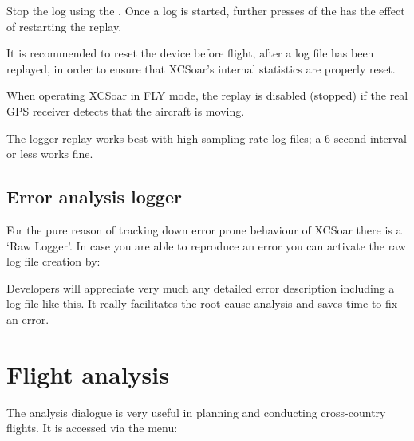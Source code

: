 Stop the log using the .
Once a log is started, further presses of the  has the
effect of restarting the replay.

\tip It is recommended to reset the device before flight, after a log
file has been replayed, in order to ensure that XCSoar's internal
statistics are properly reset.

When operating XCSoar in FLY mode, the replay is disabled (stopped) if
the real GPS receiver detects that the aircraft is moving.

The logger replay works best with high sampling rate log files;
a 6 second interval or less works fine.

\subsection*{Error analysis logger}\label{sec:raw-logger}
For the pure reason of tracking down error prone behaviour of XCSoar
there is a `Raw Logger'. In case you are able to reproduce an error you can
activate the raw log file creation by:
\begin{quote}
\blink{}
\end{quote}
Developers will appreciate very much any detailed error description including a log file like this. It really facilitates the root cause analysis and saves time to fix an error.

\section{Flight analysis} \label{sec:analysis-climb}

The analysis dialogue is very useful in planning and conducting
cross-country flights.  It is accessed via the menu:  
\begin{quote}
\blink{}
\end{quote}

